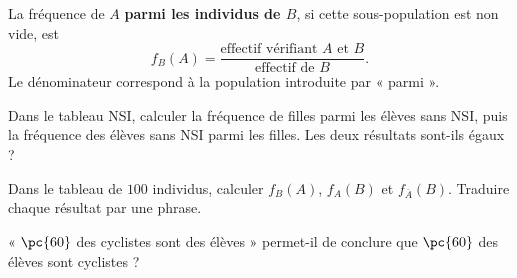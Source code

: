 \begin{keypoint}[Définition]
La fréquence de $A$ \textbf{parmi les individus de $B$}, si cette sous-population est non vide, est
\[f_B(A)=\frac{\text{effectif vérifiant }A\text{ et }B}{\text{effectif de }B}.\]
Le dénominateur correspond à la population introduite par « parmi ».
\end{keypoint}
\begin{example}Dans le tableau NSI, calculer la fréquence de filles parmi les élèves sans NSI, puis la fréquence des élèves sans NSI parmi les filles. Les deux résultats sont-ils égaux ?\end{example}
\begin{example}Dans le tableau de $100$ individus, calculer $f_B(A)$, $f_A(B)$ et $f_{\overline A}(B)$. Traduire chaque résultat par une phrase.\end{example}
\begin{example}« $\pc{60}$ des cyclistes sont des élèves » permet-il de conclure que $\pc{60}$ des élèves sont cyclistes ?\end{example}

